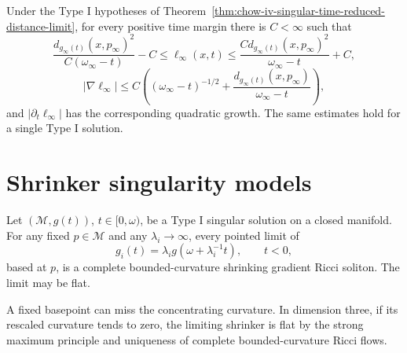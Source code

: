 \begin{proposition}
\label{prop:chow-iv-limit-reduced-distance-estimates}


Under the Type I hypotheses of
Theorem~\ref{thm:chow-iv-singular-time-reduced-distance-limit}, for every
positive time margin there is \(C<\infty\) such that
\[
 \frac{d_{g_\infty(t)}(x,p_\infty)^2}{C(\omega_\infty-t)}-C
 \leq\ell_\infty(x,t)\leq
 \frac{C d_{g_\infty(t)}(x,p_\infty)^2}{\omega_\infty-t}+C,
\]
\[
 |\nabla\ell_\infty|\leq C\left((\omega_\infty-t)^{-1/2}
 +\frac{d_{g_\infty(t)}(x,p_\infty)}{\omega_\infty-t}\right),
\]
and \(|\partial_t\ell_\infty|\) has the corresponding quadratic growth.
The same estimates hold for a single Type I solution.
\end{proposition}

\section{Shrinker singularity models}

\begin{proposition}
\label{prop:chow-iv-fixed-basepoint-type-i-limits-shrinkers}


Let \((\mathcal M,g(t))\), \(t\in[0,\omega)\), be a Type I singular
solution on a closed manifold.  For any fixed \(p\in\mathcal M\) and any
\(\lambda_i\to\infty\), every pointed limit of
\[
 g_i(t)=\lambda_i g(\omega+\lambda_i^{-1}t),\qquad t<0,
\]
based at \(p\), is a complete bounded-curvature shrinking gradient Ricci
soliton.  The limit may be flat.
\end{proposition}

\begin{remark}
\label{rem:chow-iv-flat-fixed-basepoint-type-i-limit}


A fixed basepoint can miss the concentrating curvature.  In dimension three,
if its rescaled curvature tends to zero, the limiting shrinker is flat by the
strong maximum principle and uniqueness of complete bounded-curvature Ricci
flows.
\end{remark}


